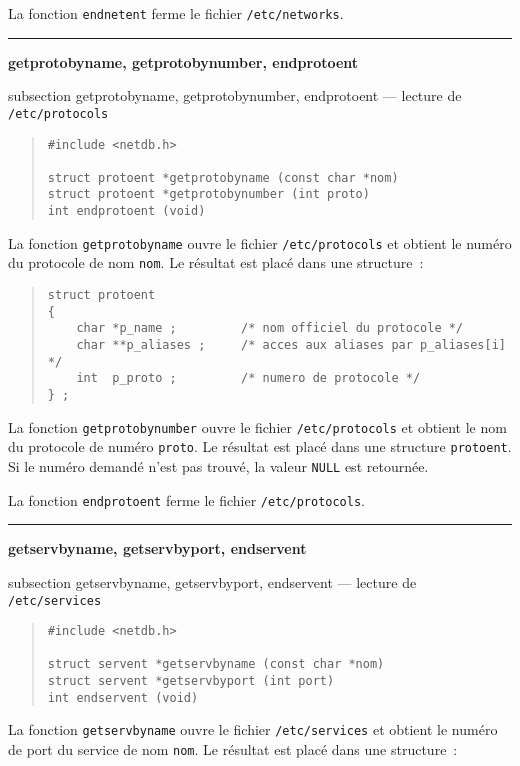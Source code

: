 \documentclass [twoside] {report}
\newcommand {\primitive} [1]
    {
	{\large \bf #1}
	\addcontentsline {toc} {subsection} {#1}
    }
\newcommand {\separation}
    {
	\vspace {7mm}
	\nopagebreak
	\hrule
    }
\begin{document}
La fonction {\tt endnetent} ferme le fichier {\tt /etc/networks}.


\separation
\primitive {getprotobyname, getprotobynumber,
endprotoent} --- lecture de {\tt /etc/protocols}

\begin {quote}
\begin {verbatim}
#include <netdb.h>

struct protoent *getprotobyname (const char *nom)
struct protoent *getprotobynumber (int proto)
int endprotoent (void)
\end{verbatim}
\end {quote}

La fonction {\tt getprotobyname} ouvre le fichier {\tt /etc/protocols}
et obtient le numéro du protocole de nom {\tt nom}.  Le résultat est
placé dans une structure~:

\begin {quote}
    \small
\begin {verbatim}
struct protoent
{
    char *p_name ;         /* nom officiel du protocole */
    char **p_aliases ;     /* acces aux aliases par p_aliases[i] */
    int  p_proto ;         /* numero de protocole */
} ;
\end{verbatim}
\end {quote}

La fonction {\tt getprotobynumber} ouvre le fichier {\tt /etc/protocols}
et obtient le nom du protocole de numéro {\tt proto}.  Le résultat est
placé dans une structure {\tt protoent}.  Si le numéro demandé n'est pas
trouvé, la valeur {\tt NULL} est retournée.

La fonction {\tt endprotoent} ferme le fichier {\tt /etc/protocols}.


\separation
\primitive {getservbyname, getservbyport,
endservent} --- lecture de {\tt /etc/services}

\begin {quote}
\begin {verbatim}
#include <netdb.h>

struct servent *getservbyname (const char *nom)
struct servent *getservbyport (int port)
int endservent (void)
\end{verbatim}
\end {quote}

La fonction {\tt getservbyname} ouvre le fichier {\tt /etc/services} et
obtient le numéro de port du service de nom {\tt nom}.  Le résultat est
placé dans une structure~:
\end{document}
